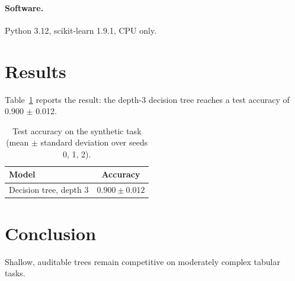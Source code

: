 \documentclass[11pt]{article}
\begin{document}
\paragraph{Software.} Python 3.12, scikit-learn 1.9.1, CPU only.

\section{Results}
Table~\ref{tab:synthetic-tree} reports the result: the depth-3 decision tree reaches a test
accuracy of 0.900 $\pm$ 0.012.

\begin{table}[t]
\centering
\caption{Test accuracy on the synthetic task (mean $\pm$ standard deviation over seeds 0, 1, 2).}
\label{tab:synthetic-tree}
\begin{tabular}{lc}
\toprule
Model & Accuracy \\
\midrule
Decision tree, depth 3 & $0.900 \pm 0.012$ \\
\bottomrule
\end{tabular}
\end{table}

\section{Conclusion}
Shallow, auditable trees remain competitive on moderately complex tabular tasks.
\end{document}
